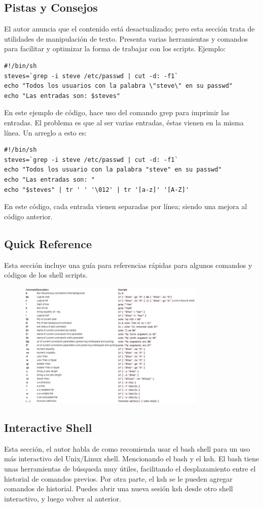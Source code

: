 \documentclass[a4paper]{article}
\begin{document}
\subsection{Pistas y Consejos}
El autor anuncia que el contenido está desactualizado; pero esta sección trata de  utilidades de manipulación de texto. Presenta varias herramientas y comandos para facilitar y optimizar la forma de trabajar con los scripts.
Ejemplo:
\begin{verbatim}
#!/bin/sh
steves=`grep -i steve /etc/passwd | cut -d: -f1`
echo "Todos los usuarios con la palabra \"steve\" en su passwd"
echo "Las entradas son: $steves"
\end{verbatim}
En este ejemplo de código, hace uso del comando grep para imprimir las entradas. El problema es que al ser varias entradas, éstas vienen en la misma línea. Un arreglo a esto es:
\begin{verbatim}
#!/bin/sh
steves=`grep -i steve /etc/passwd | cut -d: -f1`
echo "Todos los usuario con la palabra "steve" en su passwd"
echo "Las entradas son: "
echo "$steves" | tr ' ' '\012' | tr '[a-z]' '[A-Z]'
\end{verbatim}
En este código, cada entrada vienen separadas por línea; siendo una mejora al código anterior.

\pagebreak

\subsection{Quick Reference}
Esta sección incluye una guía para referencias rápidas para algunos comandos y códigos de los shell scripts. 
\begin{figure}[h!]
 \centering
  \includegraphics[width=0.8\textwidth]{SintesisQR.PNG}
\end{figure}

\subsection{Interactive Shell}
Esta sección, el autor habla de como recomienda usar el bash shell para un uso más interactivo del Unix/Linux shell. Mencionando el bash y el ksh.
El bash tiene unas herramientas de búsqueda muy útiles, facilitando el desplazamiento entre el historial de comandos previos. Por otra parte, el ksh se le pueden agregar comandos de historial. Puedes abrir una nueva sesión ksh desde otro shell interactivo, y luego volver al anterior. 
\end{document}
